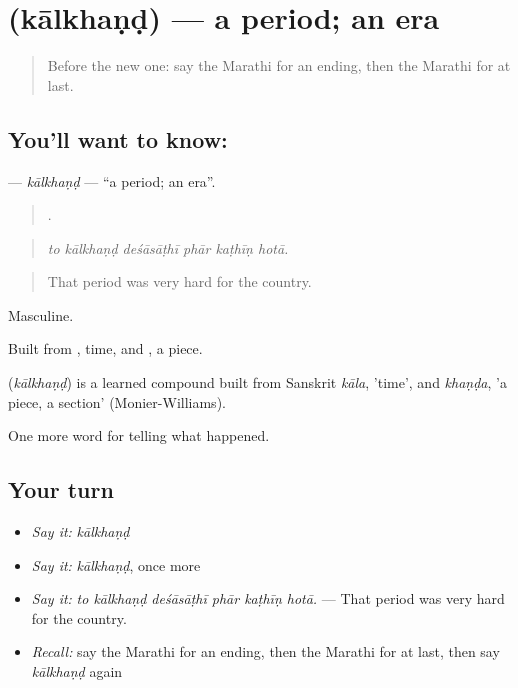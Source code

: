 \section[\texorpdfstring{\mr{कालखंड} (kālkhaṇḍ)}{कालखंड (kālkhaṇḍ)}]{ (kālkhaṇḍ) — a period; an era}

\label{lesson:MR-C307-kalkhand}



\begin{quote}
Before the new one: say the Marathi for an ending, then the Marathi for at last.
\end{quote}

\subsection*{You'll want to know: }
\textbf{} — \emph{kālkhaṇḍ} — \textquotedblleft{}a period; an era\textquotedblright{}.

\begin{quote}
     .
\end{quote}

\begin{quote}
\emph{to kālkhaṇḍ deśāsāṭhī phār kaṭhīṇ hotā.}
\end{quote}

\begin{quote}
That period was very hard for the country.
\end{quote}

Masculine.

Built from , time, and , a piece.

\begin{cousinweb}
\textbf{} (\emph{kālkhaṇḍ}) is a learned compound built from Sanskrit \emph{kāla}, 'time', and \emph{khaṇḍa}, 'a piece, a section' (Monier-Williams).
\end{cousinweb}

\begin{grammarlens}[title={What you've built}]
One more word for telling what happened.
\end{grammarlens}

\subsection*{Your turn}
\begin{itemize}
\raggedright
  \item \emph{Say it:} \emph{kālkhaṇḍ}
  \item \emph{Say it:} \emph{kālkhaṇḍ}, once more
  \item \emph{Say it:} \emph{to kālkhaṇḍ deśāsāṭhī phār kaṭhīṇ hotā.} — That period was very hard for the country.
  \item \emph{Recall:} say the Marathi for an ending, then the Marathi for at last, then say \emph{kālkhaṇḍ} again
\end{itemize}

